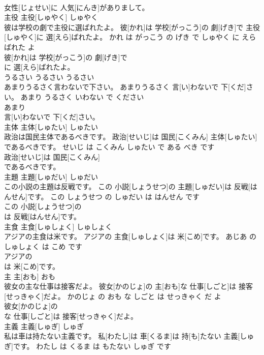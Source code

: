 \documentclass[8pt]{extreport}
\begin{document}
\begin{CJK}{UTF8}{min}
\\	女性[じょせい]に 人気[にんき]がありまして。			
\\	主役	主役[しゅやく]	しゅやく	
\\	彼は学校の劇で主役に選ばれたよ。	彼[かれ]は 学校[がっこう]の 劇[げき]で 主役[しゅやく]に 選[えら]ばれたよ。	かれ は がっこう の げき で しゅやく に えらばれた よ	
\\	彼[かれ]は 学校[がっこう]の 劇[げき]で
\\	に 選[えら]ばれたよ。			
\\	うるさい	うるさい	うるさい	
\\	あまりうるさく言わないで下さい。	あまりうるさく 言[い]わないで 下[くだ]さい。	あまり うるさく いわない で ください	
\\	あまり
\\	言[い]わないで 下[くだ]さい。			
\\	主体	主体[しゅたい]	しゅたい	
\\	政治は国民主体であるべきです。	政治[せいじ]は 国民[こくみん] 主体[しゅたい]であるべきです。	せいじ は こくみん しゅたい で ある べき です	
\\	政治[せいじ]は 国民[こくみん]
\\	であるべきです。			
\\	主題	主題[しゅだい]	しゅだい	
\\	この小説の主題は反戦です。	この 小説[しょうせつ]の 主題[しゅだい]は 反戦[はんせん]です。	この しょうせつ の しゅだい は はんせん です	
\\	この 小説[しょうせつ]の
\\	は 反戦[はんせん]です。			
\\	主食	主食[しゅしょく]	しゅしょく	
\\	アジアの主食は米です。	アジアの 主食[しゅしょく]は 米[こめ]です。	あじあ の しゅしょく は こめ です	
\\	アジアの
\\	は 米[こめ]です。			
\\	主	主[おも]	おも	
\\	彼女の主な仕事は接客だよ。	彼女[かのじょ]の 主[おも]な 仕事[しごと]は 接客[せっきゃく]だよ。	かのじょ の おも な しごと は せっきゃく だ よ	
\\	彼女[かのじょ]の
\\	な 仕事[しごと]は 接客[せっきゃく]だよ。			
\\	主義	主義[しゅぎ]	しゅぎ	
\\	私は車は持たない主義です。	私[わたし]は 車[くるま]は 持[も]たない 主義[しゅぎ]です。	わたし は くるま は もたない しゅぎ です	

\end{CJK}
\end{document}
